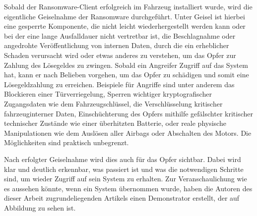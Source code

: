 Sobald der Ransomware-Client erfolgreich im Fahrzeug installiert wurde, wird die eigentliche Geiselnahme der Ransomware durchgeführt. Unter Geisel ist hierbei eine gesperrte Komponente, die nicht leicht wiederhergestellt werden kann oder bei der eine lange Ausfalldauer nicht vertretbar ist, die Beschlagnahme oder angedrohte Veröffentlichung von internen Daten, durch die ein erheblicher Schaden verursacht wird oder etwas anderes zu verstehen, um das Opfer zur Zahlung des Lösegeldes zu zwingen. Sobald ein Angreifer Zugriff auf das System hat, kann er nach Belieben vorgehen, um das Opfer zu schädigen und somit eine Lösegeldzahlung zu erreichen. Beispiele für Angriffe sind unter anderem das Blockieren einer Türverriegelung, Sperren wichtiger kryptografischer Zugangsdaten wie dem Fahrzeugschlüssel, die Verschlüsselung kritischer fahrzeuginterner Daten, Einschüchterung des Opfers mithilfe gefälschter kritischer technischer Zustände wie einer überhitzten Batterie, oder reale physische Manipulationen wie dem Auslösen aller Airbags oder Abschalten des Motors. Die Möglichkeiten sind praktisch unbegrenzt.

Nach erfolgter Geiselnahme wird dies auch für das Opfer sichtbar. Dabei wird klar und deutlich erkennbar, was passiert ist und was die notwendigen Schritte sind, um wieder Zugriff auf sein System zu erhalten. Zur Veranschaulichung wie es aussehen könnte, wenn ein System übernommen wurde, haben die Autoren des dieser Arbeit zugrundeliegenden Artikels einen Demonstrator erstellt, der auf Abbildung  zu sehen ist. 

